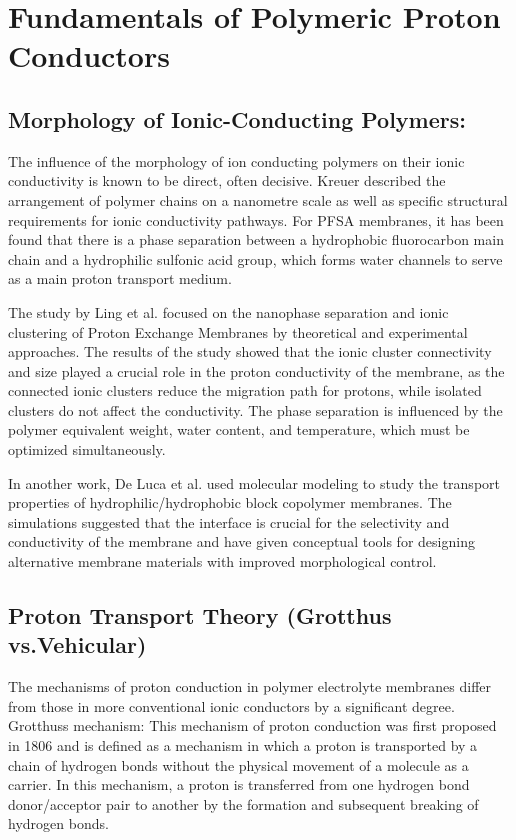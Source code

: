 \documentclass[12pt,a4paper]{report}
\begin{document}
\section{Fundamentals of Polymeric Proton Conductors}
\subsection{Morphology of Ionic-Conducting Polymers:}
The influence of the morphology of ion conducting polymers on their ionic conductivity is known to be direct, often decisive. Kreuer described the arrangement of polymer chains on a nanometre scale as well as specific structural requirements for ionic conductivity pathways.\cite{7} For PFSA membranes, it has been found that there is a phase separation between a hydrophobic fluorocarbon main chain and a hydrophilic sulfonic acid group, which forms water channels to serve as a main proton transport medium.

The study by Ling et al. focused on the nanophase separation and ionic clustering of Proton Exchange Membranes by theoretical and experimental approaches.\cite{25} The results of the study showed that the ionic cluster connectivity and size played a crucial role in the proton conductivity of the membrane, as the connected ionic clusters reduce the migration path for protons, while isolated clusters do not affect the conductivity. The phase separation is influenced by the polymer equivalent weight, water content, and temperature, which must be optimized simultaneously.

In another work, De Luca et al. used molecular modeling to study the transport properties of hydrophilic/hydrophobic block copolymer membranes.\cite{26} The simulations suggested that the interface is crucial for the selectivity and conductivity of the membrane and have given conceptual tools for designing alternative membrane materials with improved morphological control.



\subsection{Proton Transport Theory (Grotthus vs.Vehicular)}
The mechanisms of proton conduction in polymer electrolyte membranes differ from those in more conventional ionic conductors by a significant degree. Grotthuss mechanism: This mechanism of proton conduction was first proposed in 1806 and is defined as a mechanism in which a proton is transported by a chain of hydrogen bonds without the physical movement of a molecule as a carrier.\cite{16} In this mechanism, a proton is transferred from one hydrogen bond donor/acceptor pair to another by the formation and subsequent breaking of hydrogen bonds.
\end{document}
